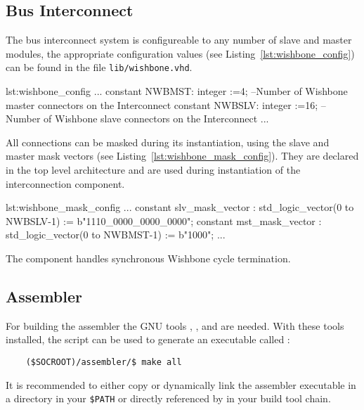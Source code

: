 \subsection{Bus Interconnect}
The bus interconnect system is configureable to any number of slave and master modules,
the appropriate configuration values (see Listing~\ref{lst:wishbone_config}) can be found in the file \verb=lib/wishbone.vhd=.
\begin{vhdl}{lst:wishbone_config}
...
constant NWBMST:	integer	:=4; 
	--Number of Wishbone master connectors on the Interconnect
constant NWBSLV:	integer :=16; 
	--Number of Wishbone slave connectors on the Interconnect
...
\end{vhdl}
All connections can be masked during its instantiation,
using the slave and master mask vectors (see Listing~\ref{lst:wishbone_mask_config}).
They are declared in the top level architecture and are used during instantiation of the interconnection component.
\begin{vhdl}{lst:wishbone_mask_config}
...
	constant slv_mask_vector : std_logic_vector(0 to NWBSLV-1) := b"1110_0000_0000_0000";
	constant mst_mask_vector : std_logic_vector(0 to NWBMST-1) := b"1000";
...
\end{vhdl}
The component handles synchronous Wishbone cycle termination.

\subsection{Assembler}
For building the assembler the GNU tools , ,  and  are needed. With these tools installed, the  script can be used to generate an executable called :
\begin{verbatim}
	($SOCROOT)/assembler/$ make all
\end{verbatim}

It is recommended to either copy or dynamically link the assembler executable in a directory in your \verb=$PATH= or  directly referenced by in your build tool chain.
